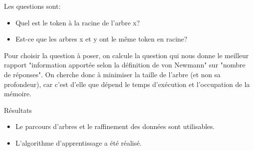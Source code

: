 \begin{frame}

Les questions sont:
\begin{itemize}
    \item Quel est le token à la racine de l'arbre x?
    \item Est-ce que les arbres x et y ont le même token en racine?
\end{itemize}


Pour choisir la question à poser, 
on calcule la question qui nous donne le meilleur rapport "information apportée selon la définition de von Newmann" sur "nombre de réponses". 
On cherche donc à minimiser la taille de l'arbre (et non sa profondeur),
car c'est d'elle que dépend le temps d'exécution et l'occupation de la mémoire.
\end{frame}
\begin{frame}

Résultats
\begin{itemize}
    \item Le parcours d'arbres et le raffinement des données sont utilisables.
    \item L'algorithme d'apprentissage a été réalisé.
\end{itemize}




\end{frame}
